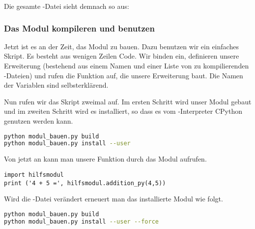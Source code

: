 Die gesamte \C-Datei sieht demnach so aus:


\subsubsection{Das Modul kompileren und benutzen}
Jetzt ist es an der Zeit, das Modul zu bauen.
Dazu benutzen wir ein einfaches \Python Skript.
Es besteht aus wenigen Zeilen Code.
Wir binden  ein,
definieren unsere Erweiterung (bestehend aus einem Namen und einer Liste von zu kompilierenden \C-Dateien)
und rufen die Funktion auf, die unsere Erweiterung baut.
Die Namen der Variablen sind selbsterklärend.

Nun rufen wir das Skript zweimal auf.
Im ersten Schritt wird unser Modul gebaut und im zweiten Schritt wird es installiert, so dass es vom \Python-Interpreter CPython genutzen werden kann.
\begin{lstlisting}[language=bash]
python modul_bauen.py build
python modul_bauen.py install --user
\end{lstlisting}
Von jetzt an kann man unsere Funktion durch das Modul  aufrufen.
\begin{lstlisting}
import hilfsmodul
print ('4 + 5 =', hilfsmodul.addition_py(4,5))
\end{lstlisting}

Wird die \C-Datei verändert erneuert man das installierte Modul wie folgt.
\begin{lstlisting}[language=bash]
python modul_bauen.py build
python modul_bauen.py install --user --force
\end{lstlisting}